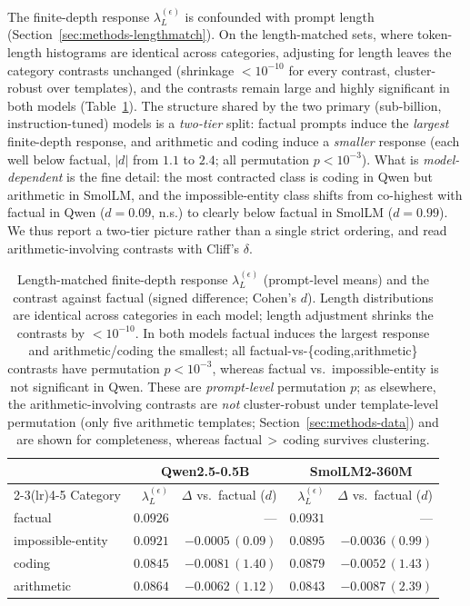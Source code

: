 \documentclass{article}
\begin{document}
The finite-depth response $\lambda_L^{(\epsilon)}$ is confounded with prompt length
(Section~\ref{sec:methods-lengthmatch}). On the length-matched sets, where token-length
histograms are identical across categories, adjusting for length leaves the category contrasts
unchanged (shrinkage $<10^{-10}$ for every contrast, cluster-robust over templates), and the
contrasts remain large and highly significant in both models (Table~\ref{tab:lm-dynamics}). The
structure shared by the two primary (sub-billion, instruction-tuned) models is a \emph{two-tier}
split: factual prompts induce the
\emph{largest} finite-depth response, and arithmetic and coding induce a \emph{smaller} response
(each well below factual, $|d|$ from $1.1$ to $2.4$; all permutation $p<10^{-3}$). What is
\emph{model-dependent} is the fine detail: the most contracted class is coding in Qwen but
arithmetic in SmolLM, and the impossible-entity class shifts from co-highest with factual in
Qwen ($d=0.09$, n.s.) to clearly below factual in SmolLM ($d=0.99$). We thus report a two-tier
picture rather than a single strict ordering, and read arithmetic-involving contrasts with Cliff's
$\delta$.

\begin{table}[t]\centering\small
\begin{tabular}{lrrrr}
\toprule
 & \multicolumn{2}{c}{Qwen2.5-0.5B} & \multicolumn{2}{c}{SmolLM2-360M} \\
\cmidrule(lr){2-3}\cmidrule(lr){4-5}
Category & $\lambda_L^{(\epsilon)}$ & $\Delta$ vs.\ factual ($d$) & $\lambda_L^{(\epsilon)}$ & $\Delta$ vs.\ factual ($d$) \\
\midrule
factual             & $0.0926$ & ---                & $0.0931$ & ---                \\
impossible-entity & $0.0921$ & $-0.0005\,(0.09)$  & $0.0895$ & $-0.0036\,(0.99)$  \\
coding              & $0.0845$ & $-0.0081\,(1.40)$  & $0.0879$ & $-0.0052\,(1.43)$  \\
arithmetic           & $0.0864$ & $-0.0062\,(1.12)$  & $0.0843$ & $-0.0087\,(2.39)$  \\
\bottomrule
\end{tabular}
\caption{Length-matched finite-depth response $\lambda_L^{(\epsilon)}$ (prompt-level means) and
the contrast against factual (signed difference; Cohen's $d$). Length distributions are identical
across categories in each model; length adjustment shrinks the contrasts by $<10^{-10}$. In both
models factual induces the largest response and arithmetic/coding the smallest; all
factual-vs-\{coding,arithmetic\} contrasts have permutation $p<10^{-3}$, whereas factual vs.\
impossible-entity is not significant in Qwen. These are \emph{prompt-level} permutation $p$; as
elsewhere, the arithmetic-involving contrasts are \emph{not} cluster-robust under template-level
permutation (only five arithmetic templates; Section~\ref{sec:methods-data}) and are shown for
completeness, whereas factual\,$>$\,coding survives clustering.}
\label{tab:lm-dynamics}
\end{table}
\end{document}
